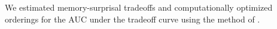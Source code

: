\documentclass[11pt,letterpaper]{article}
\newcommand{\citet}{\Textcite}
\newcommand\mhahn[1]{{\color{red}(#1)}}
\begin{document}
We estimated memory-surprisal tradeoffs and computationally optimized orderings for the AUC under the tradeoff curve using the method of \citet{Hahn2020modeling}.



\end{document}
